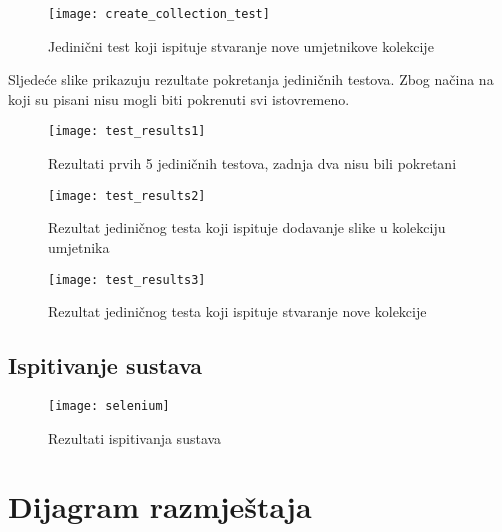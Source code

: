 {				\begin{figure}[H]
					
					\texttt{[image: create\_collection\_test]}
					\caption{Jedinični test koji ispituje stvaranje nove umjetnikove kolekcije}
					
				\end{figure}
			
			{Sljedeće slike prikazuju rezultate pokretanja jediničnih testova. Zbog načina na koji su pisani nisu mogli biti pokrenuti svi istovremeno.}
				\begin{figure}[H]
					
					\texttt{[image: test\_results1]}
					\caption{Rezultati prvih 5 jediničnih testova, zadnja dva nisu bili pokretani}
					
				\end{figure}
			
				\begin{figure}[H]
					
					\texttt{[image: test\_results2]}
					\caption{Rezultat jediničnog testa koji ispituje dodavanje slike u kolekciju umjetnika}
					
				\end{figure}
				
				\begin{figure}[H]
					
					\texttt{[image: test\_results3]}
					\caption{Rezultat jediničnog testa koji ispituje stvaranje nove kolekcije}
					
				\end{figure}
			
			\eject	
			
			\subsection{Ispitivanje sustava}
			\begin{figure}[H]
			
			 \texttt{[image: selenium]}
			 \caption{Rezultati ispitivanja sustava}
		\end{figure}
			\eject 
		
		
		\section{Dijagram razmještaja}
			
}

